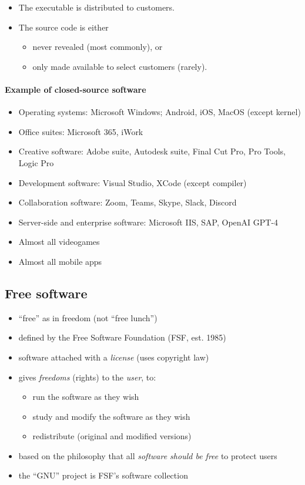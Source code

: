 \documentclass[12pt]{article}
\begin{document}
\begin{itemize}
    \item The executable is distributed to customers.
    \item The source code is either
    \begin{itemize}
        \item never revealed (most commonly), or
        \item only made available to select customers (rarely).
    \end{itemize}
\end{itemize}
\paragraph{Example of closed-source software}

\begin{itemize}
    \item Operating systems: Microsoft Windows; Android, iOS, MacOS (except kernel)
    \item Office suites: Microsoft 365, iWork
    \item Creative software: Adobe suite, Autodesk suite, Final Cut Pro, Pro Tools, Logic Pro
    \item Development software: Visual Studio, XCode (except compiler)
    \item Collaboration software: Zoom, Teams, Skype, Slack, Discord
    \item Server-side and enterprise software: Microsoft IIS, SAP, OpenAI GPT-4
    \item Almost all videogames
    \item Almost all mobile apps
\end{itemize}
\subsection{Free software}
\begin{itemize}
    \item ``free'' as in freedom (not ``free lunch'')
    \item defined by the Free Software Foundation (FSF, est. 1985)
    \item software attached with a \textit{license} (uses copyright law)
    \item gives \textit{freedoms} (rights) to the \textit{user}, to:
    \begin{itemize}
        \item run the software as they wish
        \item study and modify the software as they wish
        \item redistribute (original and modified versions)
    \end{itemize}
    \item based on the philosophy that all \textit{software should be free} to protect users
    \item the ``GNU'' project is FSF's software collection
\end{itemize}
\end{document}
